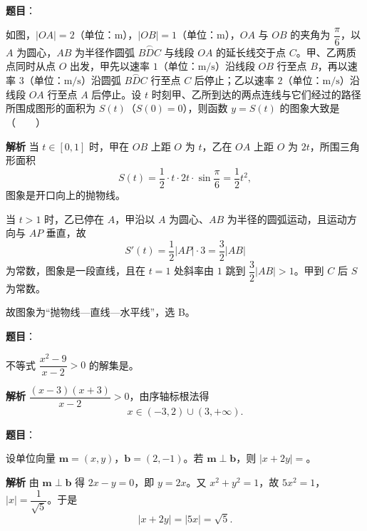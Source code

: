 \begin{answer}

\textbf{题目}：

如图，$|OA|=2$（单位：$\mathrm m$），$|OB|=1$（单位：$\mathrm m$），$OA$ 与 $OB$ 的夹角为 $\dfrac\pi6$，以 $A$ 为圆心，$AB$ 为半径作圆弧 $\overset{\frown}{BDC}$ 与线段 $OA$ 的延长线交于点 $C$。甲、乙两质点同时从点 $O$ 出发，甲先以速率 $1$（单位：$\mathrm m/\mathrm s$）沿线段 $OB$ 行至点 $B$，再以速率 $3$（单位：$\mathrm m/\mathrm s$）沿圆弧 $\overset{\frown}{BDC}$ 行至点 $C$ 后停止；乙以速率 $2$（单位：$\mathrm m/\mathrm s$）沿线段 $OA$ 行至点 $A$ 后停止。设 $t$ 时刻甲、乙所到达的两点连线与它们经过的路径所围成图形的面积为 $S(t)$（$S(0)=0$），则函数 $y=S(t)$ 的图象大致是\mbox{（　　）}
\nopagebreak[4]
\begin{center}\end{center}
\nopagebreak[4]
\textbf{解析}
当 $t\in[0,1]$ 时，甲在 $OB$ 上距 $O$ 为 $t$，乙在 $OA$ 上距 $O$ 为 $2t$，所围三角形面积
\nopagebreak[4]
\[S(t)=\frac12\cdot t\cdot2t\cdot\sin\frac\pi6=\frac12t^2,\]
图象是开口向上的抛物线。

当 $t>1$ 时，乙已停在 $A$，甲沿以 $A$ 为圆心、$AB$ 为半径的圆弧运动，且运动方向与 $AP$ 垂直，故
\nopagebreak[4]
\[S'(t)=\frac12|AP|\cdot3=\frac32|AB|\]
为常数，图象是一段直线，且在 $t=1$ 处斜率由 $1$ 跳到 $\dfrac32|AB|>1$。甲到 $C$ 后 $S$ 为常数。

故图象为“抛物线—直线—水平线”，选 B。


\end{answer}
\begin{answer}

\textbf{题目}：

不等式 $\dfrac{x^2-9}{x-2}>0$ 的解集是\gkblank{}。

\textbf{解析}
$\dfrac{(x-3)(x+3)}{x-2}>0$，由序轴标根法得
\nopagebreak[4]
\[x\in(-3,2)\cup(3,+\infty).\]


\end{answer}
\begin{answer}

\textbf{题目}：

设单位向量 $\boldsymbol m=(x,y)$，$\boldsymbol b=(2,-1)$。若 $\boldsymbol m\perp\boldsymbol b$，则 $|x+2y|=$\gkblank{}。

\textbf{解析}
由 $\boldsymbol m\perp\boldsymbol b$ 得 $2x-y=0$，即 $y=2x$。又 $x^2+y^2=1$，故 $5x^2=1$，$|x|=\dfrac1{\sqrt5}$。于是
\nopagebreak[4]
\[|x+2y|=|5x|=\sqrt5.\]


\end{answer}
